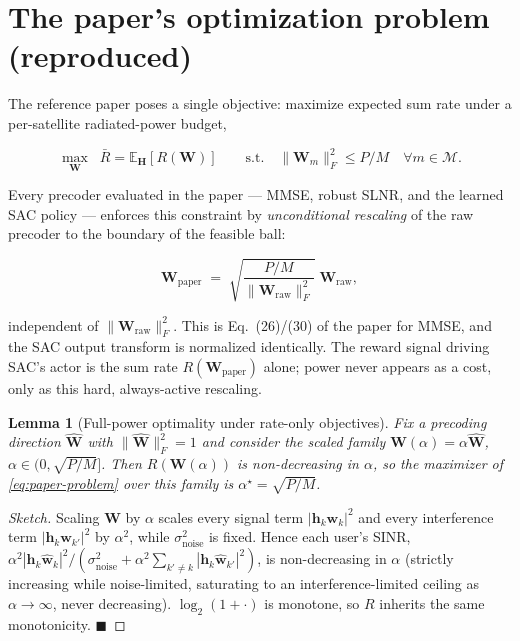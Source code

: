 \documentclass[11pt]{article}
\newtheorem{lemma}{Lemma}
\begin{document}
\section{The paper's optimization problem (reproduced)}
\label{sec:paper-problem}

The reference paper poses a single objective: maximize expected sum rate
under a per-satellite radiated-power budget,

\begin{equation}
  \max_{\mathbf{W}} \;\; \bar{R} = \mathbb{E}_{\mathbf{H}}[R(\mathbf{W})]
  \qquad \text{s.t.} \quad \|\mathbf{W}_m\|_F^2 \le P/M \quad \forall m\in\mathcal{M}.
  \label{eq:paper-problem}
\end{equation}

Every precoder evaluated in the paper --- MMSE, robust SLNR, and the
learned SAC policy --- enforces this constraint by \emph{unconditional
rescaling} of the raw precoder to the boundary of the feasible ball:

\begin{equation}
  \mathbf{W}_{\text{paper}} \;=\; \sqrt{\frac{P/M}{\|\mathbf{W}_{\text{raw}}\|_F^2}}\;\mathbf{W}_{\text{raw}},
  \label{eq:paper-normalization}
\end{equation}

independent of $\|\mathbf{W}_{\text{raw}}\|_F^2$. This is Eq.~(26)/(30) of the
paper for MMSE, and the SAC output transform is normalized identically. The
reward signal driving SAC's actor is the sum rate $R(\mathbf{W}_{\text{paper}})$
alone; power never appears as a cost, only as this hard, always-active
rescaling.

\begin{lemma}[Full-power optimality under rate-only objectives]
\label{lem:saturate}
Fix a precoding \emph{direction} $\hat{\mathbf{W}}$ with
$\|\hat{\mathbf{W}}\|_F^2=1$ and consider the scaled family
$\mathbf{W}(\alpha) = \alpha\hat{\mathbf{W}}$, $\alpha\in(0,\sqrt{P/M}]$. Then
$R(\mathbf{W}(\alpha))$ is non-decreasing in $\alpha$, so the maximizer of
\eqref{eq:paper-problem} over this family is $\alpha^\star = \sqrt{P/M}$.
\end{lemma}

\begin{proof}[Sketch]
Scaling $\mathbf{W}$ by $\alpha$ scales every signal term
$|\mathbf{h}_k\mathbf{w}_k|^2$ and every interference term
$|\mathbf{h}_k\mathbf{w}_{k'}|^2$ by $\alpha^2$, while
$\sigma_{\text{noise}}^2$ is fixed. Hence each user's SINR,
$\alpha^2|\mathbf{h}_k\hat{\mathbf{w}}_k|^2 /
(\sigma_{\text{noise}}^2 + \alpha^2\sum_{k'\neq k}|\mathbf{h}_k\hat{\mathbf{w}}_{k'}|^2)$,
is non-decreasing in $\alpha$ (strictly increasing while noise-limited,
saturating to an interference-limited ceiling as $\alpha\to\infty$, never
decreasing). $\log_2(1+\cdot)$ is monotone, so $R$ inherits the same
monotonicity. $\blacksquare$
\end{proof}
\end{document}
